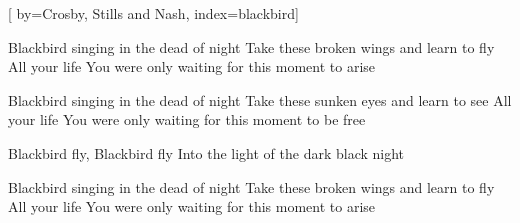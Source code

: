 
[%
    by={Crosby, Stills and Nash},
    index={blackbird}]


    \label{blackbird}

    \beginverse
        Blackbird singing in the dead of night
        Take these broken wings and learn to fly
        All your life
        You were only waiting for this moment to arise
    \endverse

    \beginverse
        Blackbird singing in the dead of night
        Take these sunken eyes and learn to see
        All your life
        You were only waiting for this moment to be free
    \endverse

    \beginchorus
        \lrep Blackbird fly, Blackbird fly
        Into the light of the dark black night \rrep {}
    \endchorus

    \beginverse
        Blackbird singing in the dead of night
        Take these broken wings and learn to fly
        All your life
        You were only waiting for this moment to arise 
    \endverse
\endsong
